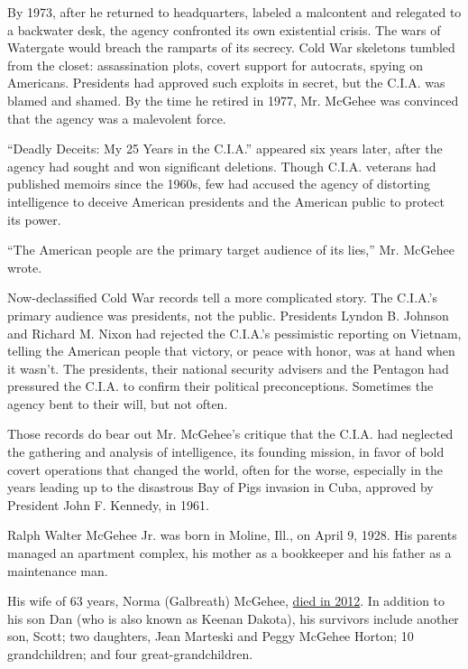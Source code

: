 By 1973, after he returned to headquarters, labeled a malcontent and
relegated to a backwater desk, the agency confronted its own existential
crisis. The wars of Watergate would breach the ramparts of its secrecy.
Cold War skeletons tumbled from the closet: assassination plots, covert
support for autocrats, spying on Americans. Presidents had approved such
exploits in secret, but the C.I.A. was blamed and shamed. By the time he
retired in 1977, Mr. McGehee was convinced that the agency was a
malevolent force.

``Deadly Deceits: My 25 Years in the C.I.A.'' appeared six years later,
after the agency had sought and won significant deletions. Though C.I.A.
veterans had published memoirs since the 1960s, few had accused the
agency of distorting intelligence to deceive American presidents and the
American public to protect its power.

``The American people are the primary target audience of its lies,'' Mr.
McGehee wrote.

Now-declassified Cold War records tell a more complicated story. The
C.I.A.'s primary audience was presidents, not the public. Presidents
Lyndon B. Johnson and Richard M. Nixon had rejected the C.I.A.'s
pessimistic reporting on Vietnam, telling the American people that
victory, or peace with honor, was at hand when it wasn't. The
presidents, their national security advisers and the Pentagon had
pressured the C.I.A. to confirm their political preconceptions.
Sometimes the agency bent to their will, but not often.

Those records do bear out Mr. McGehee's critique that the C.I.A. had
neglected the gathering and analysis of intelligence, its founding
mission, in favor of bold covert operations that changed the world,
often for the worse, especially in the years leading up to the
disastrous Bay of Pigs invasion in Cuba, approved by President John F.
Kennedy, in 1961.

Ralph Walter McGehee Jr. was born in Moline, Ill., on April 9, 1928. His
parents managed an apartment complex, his mother as a bookkeeper and his
father as a maintenance man.

His wife of 63 years, Norma (Galbreath) McGehee,
\href{https://www.legacy.com/obituaries/tampabaytimes/obituary.aspx?n=norma-mcgehee\&pid=156086530}{died
in 2012}. In addition to his son Dan (who is also known as Keenan
Dakota), his survivors include another son, Scott; two daughters, Jean
Marteski and Peggy McGehee Horton; 10 grandchildren; and four
great-grandchildren.

